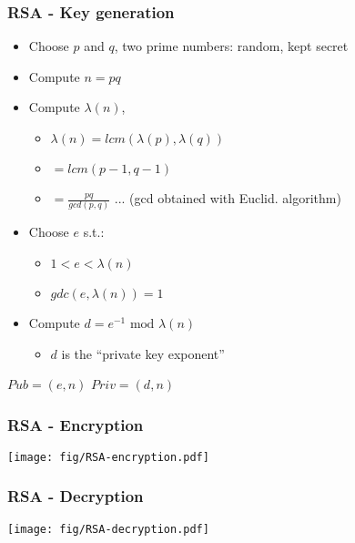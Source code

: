 \documentclass[
hyperref={pdfpagelabels=false}
,xcolor=table
]
{beamer}
\begin{document}
\begin{frame}
  \frametitle{RSA - Key generation}

  \begin{itemize}
  \item Choose $p$ and $q$, two prime numbers: random, kept secret
  \item Compute $n = pq$
  \item Compute $\lambda(n)$,
    \begin{itemize}
    \item $\lambda(n) = lcm(\lambda(p), \lambda(q))$
    \item $= lcm(p-1, q-1)$
    \item $= \frac{pq}{gcd(p,q)}$ ... (gcd obtained with Euclid. algorithm)
    \end{itemize}
  \item Choose $e$ s.t.:
    \begin{itemize}
    \item $1 < e < \lambda(n)$
    \item $gdc(e,\lambda(n))=1$
    \end{itemize}
  \item Compute $d = e^{-1} \mbox{ mod } \lambda(n)$
    \begin{itemize}
    \item $d$ is the ``private key exponent''
    \end{itemize}
  \end{itemize}

  \begin{tcolorbox}[colframe=Myred]
    $Pub = (e,n)$ \hfill $Priv = (d,n)$
  \end{tcolorbox}  
\end{frame}


\begin{frame}
  \frametitle{RSA - Encryption}

  \begin{center}
    \texttt{[image: fig/RSA-encryption.pdf]}
  \end{center}
  
\end{frame}


\begin{frame}
  \frametitle{RSA - Decryption}

  \begin{center}
    \texttt{[image: fig/RSA-decryption.pdf]}
  \end{center}
\end{frame}
\end{document}
